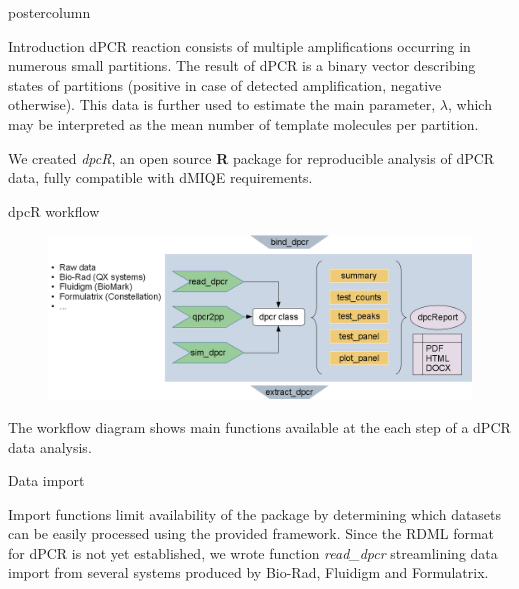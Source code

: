 \documentclass[final]{beamer}\usepackage[]{graphicx}\usepackage[]{color}
\newlength{\columnheight}
\begin{document}
\begin{frame}
\begin{columns}
\begin{column}{.46\textwidth}
\begin{beamercolorbox}[center,wd=\textwidth]{postercolumn}
\begin{minipage}[T]{.95\textwidth}
\parbox[t][\columnheight]{\textwidth}
{


\begin{block}{Introduction}
dPCR reaction consists of multiple amplifications occurring in numerous small partitions. The result of dPCR is a binary vector describing states of partitions (positive in case of detected amplification, negative otherwise). This data is further used to estimate the main parameter, $\lambda$, which may be interpreted as the mean number of template molecules per partition.

\medskip

We created \textit{dpcR}, an open source \textbf{R} package for reproducible analysis of dPCR data, fully compatible with dMIQE requirements.
\end{block}

\vfill

\begin{block}{dpcR workflow}

\begin{figure}
\begin{center}
\includegraphics{dpcR_figures/dpcR_framework.png}
\end{center}
\end{figure}

The workflow diagram shows main functions available at the each step of a dPCR data analysis.

\end{block}
\vfill


\begin{block}{Data import}

Import functions limit availability of the package by determining which datasets 
can be easily processed using the provided framework. Since the RDML format for 
dPCR is not yet established, we wrote function 
\textit{read\_dpcr} streamlining data import from several systems produced by Bio-Rad, 
Fluidigm and Formulatrix. 


\end{block}}
\end{minipage}
\end{beamercolorbox}
\end{column}
\end{columns}
\end{frame}
\end{document}
